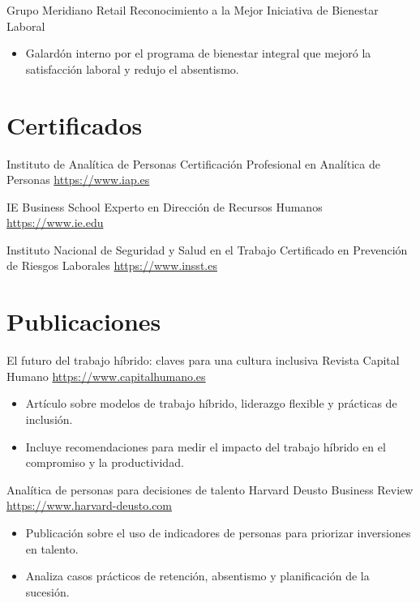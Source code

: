 \documentclass[a4paper, serif, 10pt]{moderncv}
\begin{document}
        {Grupo Meridiano Retail}
        {Reconocimiento a la Mejor Iniciativa de Bienestar Laboral}
        {}
        {}
        {\begin{itemize}
\item Galardón interno por el programa de bienestar integral que mejoró la satisfacción laboral y redujo el absentismo.
\end{itemize}}
\section{Certificados}

        {Instituto de Analítica de Personas}
        {Certificación Profesional en Analítica de Personas}
        {\url{https://www.iap.es}}
        {}
        {}

        {IE Business School}
        {Experto en Dirección de Recursos Humanos}
        {\url{https://www.ie.edu}}
        {}
        {}

        {Instituto Nacional de Seguridad y Salud en el Trabajo}
        {Certificado en Prevención de Riesgos Laborales}
        {\url{https://www.insst.es}}
        {}
        {}
\section{Publicaciones}

        {El futuro del trabajo híbrido: claves para una cultura inclusiva}
        {Revista Capital Humano}
        {\url{https://www.capitalhumano.es}}
        {}
        {\begin{itemize}
\item Artículo sobre modelos de trabajo híbrido, liderazgo flexible y prácticas de inclusión.
\item Incluye recomendaciones para medir el impacto del trabajo híbrido en el compromiso y la productividad.
\end{itemize}}

        {Analítica de personas para decisiones de talento}
        {Harvard Deusto Business Review}
        {\url{https://www.harvard-deusto.com}}
        {}
        {\begin{itemize}
\item Publicación sobre el uso de indicadores de personas para priorizar inversiones en talento.
\item Analiza casos prácticos de retención, absentismo y planificación de la sucesión.
\end{itemize}}
\end{document}
